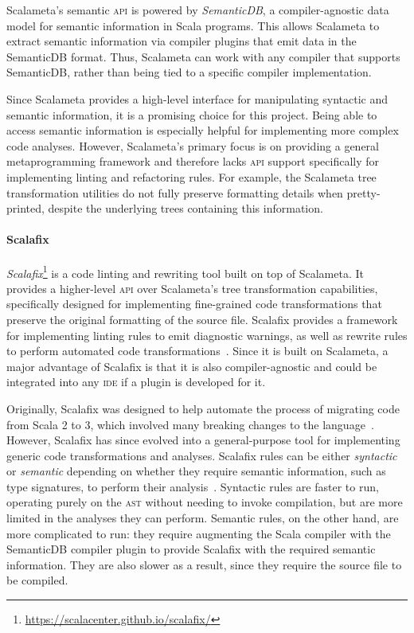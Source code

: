 \documentclass[../../main.tex]{subfiles}
\begin{document}
Scalameta's semantic \textsc{api} is powered by \textit{SemanticDB}, a compiler-agnostic data model for semantic information in Scala programs.
This allows Scalameta to extract semantic information via compiler plugins that emit data in the SemanticDB format.
Thus, Scalameta can work with any compiler that supports SemanticDB, rather than being tied to a specific compiler implementation.

Since Scalameta provides a high-level interface for manipulating syntactic and semantic information, it is a promising choice for this project.
Being able to access semantic information is especially helpful for implementing more complex code analyses.
However, Scalameta's primary focus is on providing a general metaprogramming framework and therefore lacks \textsc{api} support specifically for implementing linting and refactoring rules.
For example, the Scalameta tree transformation utilities do not fully preserve formatting details when pretty-printed, despite the underlying trees containing this information.

\paragraph{Scalafix}
\textit{Scalafix}\footnote{\url{https://scalacenter.github.io/scalafix/}} is a code linting and rewriting tool built on top of Scalameta.
It provides a higher-level \textsc{api} over Scalameta's tree transformation capabilities, specifically designed for implementing fine-grained code transformations that preserve the original formatting of the source file.
Scalafix provides a framework for implementing linting rules to emit diagnostic warnings, as well as rewrite rules to perform automated code transformations~\cite{geirsson_catch_2017}.
Since it is built on Scalameta, a major advantage of Scalafix is that it is also compiler-agnostic and could be integrated into any \textsc{ide} if a plugin is developed for it.

Originally, Scalafix was designed to help automate the process of migrating code from Scala 2 to 3, which involved many breaking changes to the language~\cite{geirsson_scalafix_2016}.
However, Scalafix has since evolved into a general-purpose tool for implementing generic code transformations and analyses.
Scalafix rules can be either \emph{syntactic} or \emph{semantic} depending on whether they require semantic information, such as type signatures, to perform their analysis~\cite{scalacenter_scalafix_2024}.
Syntactic rules are faster to run, operating purely on the \textsc{ast} without needing to invoke compilation, but are more limited in the analyses they can perform.
Semantic rules, on the other hand, are more complicated to run: they require augmenting the Scala compiler with the SemanticDB compiler plugin to provide Scalafix with the required semantic information.
They are also slower as a result, since they require the source file to be compiled.
\end{document}
